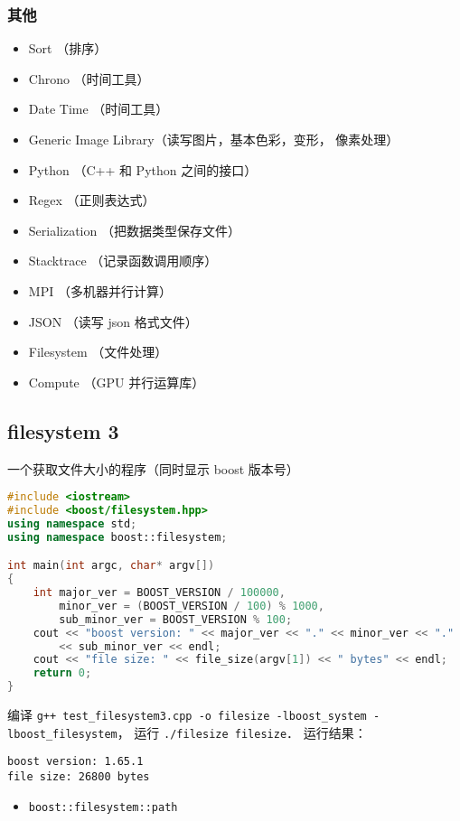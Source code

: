 \subsubsection{其他}
\begin{itemize}
\item Sort （排序）
\item Chrono （时间工具）
\item Date Time （时间工具）
\item Generic Image Library（读写图片，基本色彩，变形， 像素处理）
\item Python （C++ 和 Python 之间的接口）
\item Regex （正则表达式）
\item Serialization （把数据类型保存文件）
\item Stacktrace （记录函数调用顺序）
\item MPI （多机器并行计算）
\item JSON （读写 json 格式文件）
\item Filesystem （文件处理）
\item Compute （GPU 并行运算库）
\end{itemize}


\subsection{filesystem 3}
一个获取文件大小的程序（同时显示 boost 版本号）
\begin{lstlisting}[language=cpp, caption=test_filesystem3.cpp]
#include <iostream>
#include <boost/filesystem.hpp>
using namespace std;
using namespace boost::filesystem;

int main(int argc, char* argv[])
{
	int major_ver = BOOST_VERSION / 100000,
        minor_ver = (BOOST_VERSION / 100) % 1000,
		sub_minor_ver = BOOST_VERSION % 100;
	cout << "boost version: " << major_ver << "." << minor_ver << "."
        << sub_minor_ver << endl;
	cout << "file size: " << file_size(argv[1]) << " bytes" << endl;
	return 0;
}
\end{lstlisting}

编译 \verb|g++ test_filesystem3.cpp -o filesize -lboost_system -lboost_filesystem|， 运行 \verb|./filesize filesize|． 运行结果：
\begin{lstlisting}[language=plain]
boost version: 1.65.1
file size: 26800 bytes
\end{lstlisting}

\begin{itemize}
\item \verb|boost::filesystem::path|
\end{itemize}
